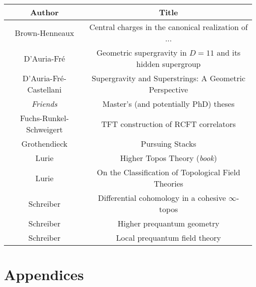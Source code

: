 \documentclass[11pt, a4paper]{report}
\begin{document}
    \begin{center}
        \begin{tabular}{|c|c|}
            \hline
            Author&Title\\
            \hline
            Brown-Henneaux&Central charges in the canonical realization of ...\\
			D'Auria-Fr\'e&Geometric supergravity in $D=11$ and its hidden supergroup\\
			D'Auria-Fr\'e-Castellani&Supergravity and Superstrings: A Geometric Perspective\\
            \textit{Friends}&Master's (and potentially PhD) theses\\
            Fuchs-Runkel-Schweigert&TFT construction of RCFT correlators\\
            Grothendieck&Pursuing Stacks\\
            Lurie&Higher Topos Theory (\textit{book})\\
            Lurie&On the Classification of Topological Field Theories\\
            Schreiber&Differential cohomology in a cohesive $\infty$-topos\\
            Schreiber&Higher prequantum geometry\\
            Schreiber&Local prequantum field theory\\
            \hline
        \end{tabular}
    \end{center}

\part{Appendices}
\begin{appendices}




\end{appendices}

\nomenclature[S_zsyminto]{$]a, b[$}{Open interval}

\printnomenclature

\nocite{*}



\printindex
\end{document}
